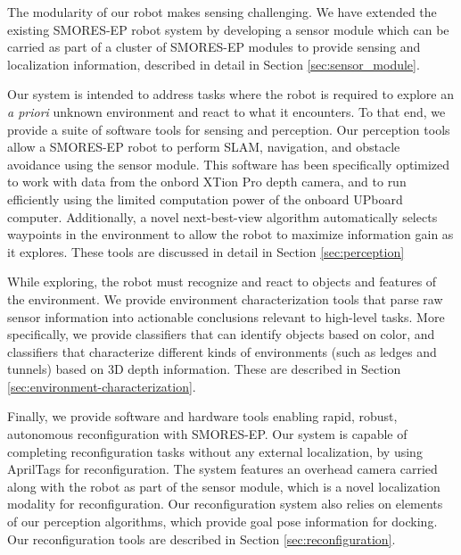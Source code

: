 \documentclass[conference]{IEEEtran}
\begin{document}
The modularity of our robot makes sensing challenging.  We have extended the existing SMORES-EP robot system by developing a sensor module which can be carried as part of a cluster of SMORES-EP modules to provide sensing and localization information, described in detail in Section \ref{sec:sensor_module}.

Our system is intended to address tasks where the robot is required to explore an \emph{a priori} unknown environment and react to what it encounters.  To that end, we provide a suite of software tools for sensing and perception. Our perception tools allow a SMORES-EP robot to perform SLAM, navigation, and obstacle avoidance using the sensor module.  This software has been specifically optimized to work with data from the onbord XTion Pro depth camera, and to run efficiently using the limited computation power of the onboard UPboard computer.  Additionally, a novel next-best-view algorithm automatically selects waypoints in the environment to allow the robot to maximize information gain as it explores.  These tools are discussed in detail in Section \ref{sec:perception}

While exploring, the robot must recognize and react to objects and features of the environment.  We provide environment characterization tools that parse raw sensor information into actionable conclusions relevant to high-level tasks.  More specifically, we provide classifiers that can identify objects based on color, and classifiers that characterize different kinds of environments (such as ledges and tunnels) based on 3D depth information.  These are described in Section \ref{sec:environment-characterization}.

Finally, we provide software and hardware tools enabling rapid, robust, autonomous reconfiguration with SMORES-EP. Our system is capable of completing reconfiguration tasks without any external localization, by using AprilTags for reconfiguration. The system features an overhead camera carried along with the robot as part of the sensor module, which is a novel localization modality for reconfiguration. Our reconfiguration system also relies on elements of our perception algorithms, which provide goal pose information for docking.  Our reconfiguration tools are described in Section \ref{sec:reconfiguration}.
\end{document}

